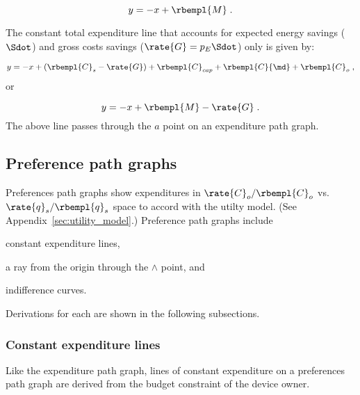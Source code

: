 \begin{equation}
  y = -x + \rbempl{M} \; .
\end{equation}

The constant total expenditure line 
that accounts for expected energy savings ($\Sdot$) 
and gross costs savings ($\rate{G} = p_E \Sdot$) only 
is given by:

\begin{equation}
  y = -x + (\rbempl{C}_s - \rate{G}) + \rbempl{C}_{cap} + \rbempl{C}{\md} + \rbempl{C}_o \; ,
\end{equation}
%
or

\begin{equation}
  y = -x + \rbempl{M} - \rate{G}\; .
\end{equation}
%
The above line passes through the $a$ point on an expenditure path graph.


\subsection{Preference path graphs}
\label{sec:prefs_path_graph_details}

Preferences path graphs show expenditures in 
$\rate{C}_o/\rbempl{C}_o$ vs.\ $\rate{q}_s/\rbempl{q}_s$ space
to accord with the utilty model.
(See Appendix~\ref{sec:utility_model}.)
Preference path graphs include 
%
\begin{enumerate*}[label={(\alph*)}]
	
  \item constant expenditure lines,
  
  \item a ray from the origin through the $\wedge$ point, and 
  
  \item indifference curves.
    
\end{enumerate*}
%
Derivations for each are shown in the following subsections.


\subsubsection{Constant expenditure lines} 
\label{sec:pref_graph_constant_expenditure_lines}

Like the expenditure path graph, 
lines of constant expenditure on a preferences path graph 
are derived from the budget constraint of the device owner.

